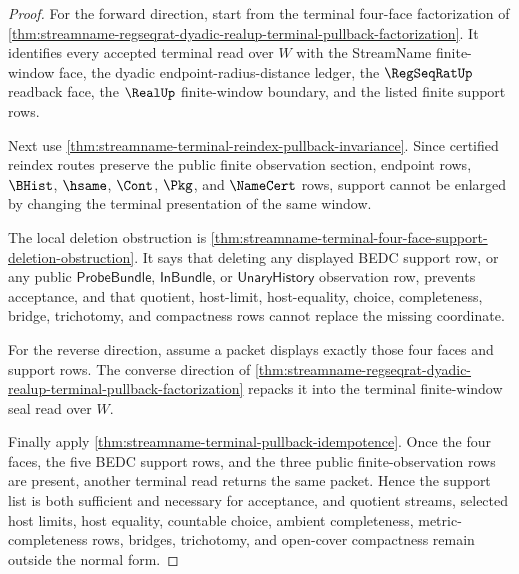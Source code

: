 \begin{proof}
For the forward direction, start from the terminal four-face factorization of
\autoref{thm:streamname-regseqrat-dyadic-realup-terminal-pullback-factorization}.
It identifies every accepted terminal read over $W$ with the StreamName
finite-window face, the dyadic endpoint-radius-distance ledger, the
$\RegSeqRatUp$ readback face, the $\RealUp$ finite-window boundary, and the
listed finite support rows.

Next use
\autoref{thm:streamname-terminal-reindex-pullback-invariance}. Since certified
reindex routes preserve the public finite observation section, endpoint rows,
$\BHist$, $\hsame$, $\Cont$, $\Pkg$, and $\NameCert$ rows, support cannot be
enlarged by changing the terminal presentation of the same window.

The local deletion obstruction is
\autoref{thm:streamname-terminal-four-face-support-deletion-obstruction}. It
says that deleting any displayed BEDC support row, or any public
$\mathsf{ProbeBundle}$, $\mathsf{InBundle}$, or $\mathsf{UnaryHistory}$
observation row, prevents acceptance, and that quotient, host-limit,
host-equality, choice, completeness, bridge, trichotomy, and compactness rows
cannot replace the missing coordinate.

For the reverse direction, assume a packet displays exactly those four faces
and support rows. The converse direction of
\autoref{thm:streamname-regseqrat-dyadic-realup-terminal-pullback-factorization}
repacks it into the terminal finite-window seal read over $W$.

Finally apply
\autoref{thm:streamname-terminal-pullback-idempotence}. Once the four faces,
the five BEDC support rows, and the three public finite-observation rows are
present, another terminal read returns the same packet. Hence the support list
is both sufficient and necessary for acceptance, and quotient streams,
selected host limits, host equality, countable choice, ambient completeness,
metric-completeness rows, bridges, trichotomy, and open-cover compactness
remain outside the normal form.
\end{proof}

